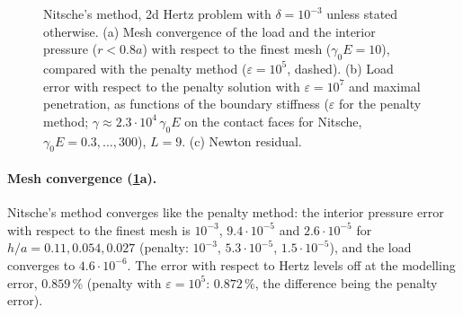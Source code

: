 \documentclass[11pt,a4paper]{article}
\begin{document}
\begin{figure}[p]
  \vspace{1em}
  \caption{Nitsche's method, 2d Hertz problem with $\delta=10^{-3}$ unless stated otherwise.
  (a) Mesh convergence of the load and the interior pressure ($r<0.8a$) with respect to the
  finest mesh ($\gamma_0E=10$), compared with the penalty method ($\varepsilon=10^5$, dashed). (b) Load error with respect to the penalty solution with
  $\varepsilon=10^7$ and maximal penetration, as functions of the boundary stiffness ($\varepsilon$
  for the penalty method; $\gamma\approx 2.3\cdot10^4\,\gamma_0E$ on the contact faces for
  Nitsche, $\gamma_0E=0.3,\dots,300$), $L=9$. (c) Newton residual.}
  \label{fig:nitsche}
\end{figure}

\paragraph{Mesh convergence (\cref{fig:nitsche}a).}
Nitsche's method converges like the penalty method: the interior pressure error with respect to the
finest mesh is $10^{-3}$, $9.4\cdot10^{-5}$ and $2.6\cdot10^{-5}$ for $h/a = 0.11, 0.054, 0.027$
(penalty: $10^{-3}$, $5.3\cdot10^{-5}$, $1.5\cdot10^{-5}$), and the load converges to
$4.6\cdot10^{-6}$. The error with respect to Hertz levels off at the modelling error, $0.859\,\%$
(penalty with $\varepsilon=10^5$: $0.872\,\%$, the difference being the penalty error).
\end{document}
